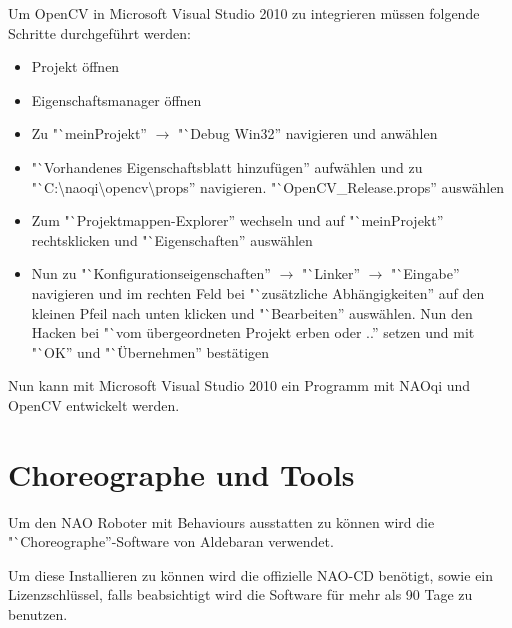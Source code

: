            Um OpenCV in Microsoft Visual Studio 2010 zu integrieren müssen
            folgende Schritte durchgeführt werden:

            \begin{itemize}
                \item Projekt öffnen
                \item Eigenschaftsmanager öffnen
                \item Zu "`meinProjekt'' $\rightarrow$ "`Debug Win32''
                    navigieren und anwählen
                \item "`Vorhandenes Eigenschaftsblatt hinzufügen'' aufwählen und
                    zu
                    "`C:\textbackslash{}naoqi\textbackslash{}opencv\textbackslash{}props''
                    navigieren. "`OpenCV\_Release.props'' auswählen

                \item Zum "`Projektmappen-Explorer'' wechseln und auf
                    "`meinProjekt'' rechtsklicken und "`Eigenschaften''
                    auswählen

                \item Nun zu "`Konfigurationseigenschaften'' $\rightarrow$ "`Linker'' $\rightarrow$
                    "`Eingabe'' navigieren und im rechten Feld bei "`zusätzliche
                    Abhängigkeiten'' auf den kleinen Pfeil nach unten klicken und
                    "`Bearbeiten'' auswählen. Nun den Hacken bei "`vom
                    übergeordneten Projekt erben oder ..'' setzen und mit "`OK''
                    und "`Übernehmen'' bestätigen
            \end{itemize}

            Nun kann mit Microsoft Visual Studio 2010 ein Programm mit NAOqi und
            OpenCV entwickelt werden.

    \section{Choreographe und Tools}
        \label{chap:inst:choero}

        Um den NAO Roboter mit Behaviours ausstatten zu können wird die
        "`Choreographe''-Software von Aldebaran verwendet.

        Um diese Installieren zu können wird die offizielle NAO-\ac{CD}
        benötigt, sowie ein Lizenzschlüssel, falls beabsichtigt wird die
        Software für mehr als 90 Tage zu benutzen.

